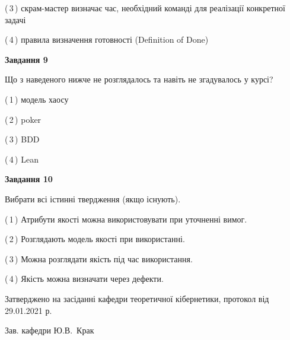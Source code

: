 \documentclass[10pt, ukrainian]{article}
\begin{document}
{\begin {large}
(\,3\,) скрам-мастер визначає час, необхідний команді для реалізації конкретної задачі%



(\,4\,) правила визначення готовності (Definition of Done) %


{\begin {center}\textbf{Завдання 9}\end {center}}\par
Що з наведеного нижче не розглядалось та навіть не згадувалось у курсі?\par
\vspace{2mm}



(\,1\,) модель хаосу%



(\,2\,) poker%



(\,3\,) BDD%



(\,4\,) Lean%


{\begin {center}\textbf{Завдання 10}\end {center}}\par
Вибрати всі істинні твердження (якщо існують).\par
\vspace{2mm}



(\,1\,) Атрибути якості можна використовувати при уточненні вимог.%



(\,2\,) Розглядають модель якості при використанні.%



(\,3\,) Можна розглядати якість під час використання.%



(\,4\,) Якість можна визначати через дефекти.%



\end {large}}
{\vspace{5mm}\smallskip \begin {small} Затверджено на засіданні кафедри теоретичної кібернетики, протокол  від   29.01.2021 р.\par\smallskip\smallskip
{\parbox {6.5 cm}{Зав. кафедри \dotfill Ю.В.~Крак}} \end{small}}
\newpage
\end{document}
